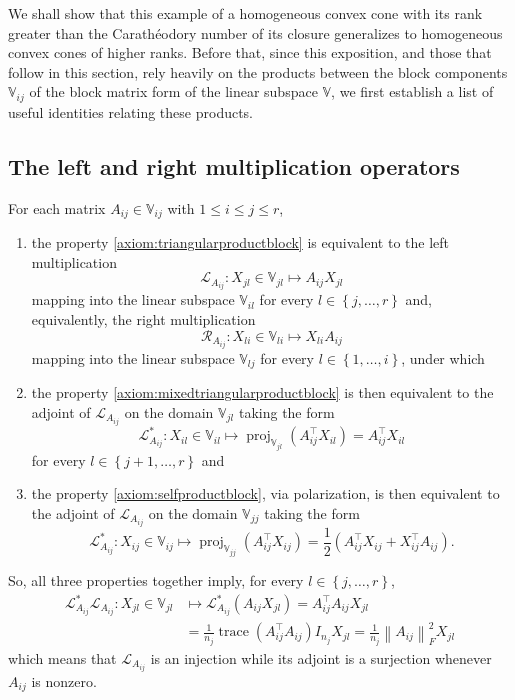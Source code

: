 \documentclass[oneside]{amsart}
\theoremstyle{plain}
\theoremstyle{definition}
\theoremstyle{remark}
\numberwithin{equation}{section}
\DeclareMathOperator{\trace}{trace}
\DeclareMathOperator{\proj}{proj}
\begin{document}
We shall show that this example of a homogeneous convex cone with its rank
greater than the Carath\'eodory number of its closure generalizes to
homogeneous convex cones of higher ranks. Before that, since this
exposition, and those that follow in this section, rely heavily on the
products between the block components $\mathbb{V}_{ij}$ of the block matrix
form of the linear subspace $\mathbb{V}$, we first establish a list of
useful identities relating these products.

\subsection{The left and right multiplication operators}
\label{section:leftrightmultiplications}

For each matrix $A_{ij} \in \mathbb{V}_{ij}$ with $1 \leq i \leq j \leq r$,
\begin{enumerate}[label=(\roman*)]
\item the property \ref{axiom:triangularproductblock} is equivalent to the
left multiplication
\[
\mathcal{L}_{A_{ij}} : X_{jl} \in \mathbb{V}_{jl} \mapsto A_{ij} X_{jl}
\]
mapping into the linear subspace $\mathbb{V}_{il}$ for every $l \in
\left\{j, \dotsc, r\right\}$ and, equivalently, the right multiplication
\[
\mathcal{R}_{A_{ij}} : X_{li} \in \mathbb{V}_{li} \mapsto X_{li} A_{ij}
\]
mapping into the linear subspace $\mathbb{V}_{lj}$ for every $l \in
\left\{1, \dotsc, i\right\}$, under which

\item the property \ref{axiom:mixedtriangularproductblock} is then
equivalent to the adjoint of $\mathcal{L}_{A_{ij}}$ on the domain
$\mathbb{V}_{jl}$ taking the form
\[
\mathcal{L}^{*}_{A_{ij}} : X_{il} \in \mathbb{V}_{il} \mapsto
\proj_{\mathbb{V}_{jl}}\left( A_{ij}^{\top} X_{il} \right) = A_{ij}^{\top}
X_{il}
\]
for every $l \in \left\{j+1, \dotsc, r\right\}$ and

\item the property \ref{axiom:selfproductblock}, via polarization, is then
equivalent to the adjoint of $\mathcal{L}_{A_{ij}}$ on the domain
$\mathbb{V}_{jj}$ taking the form
\[
\mathcal{L}^{*}_{A_{ij}} : X_{ij} \in \mathbb{V}_{ij} \mapsto
\proj_{\mathbb{V}_{jj}}\left( A_{ij}^{\top} X_{ij} \right) = \frac{1}{2}
\left( A_{ij}^{\top} X_{ij} + X_{ij}^{\top} A_{ij} \right).
\]

\end{enumerate}
So, all three properties together imply, for every $l \in \left\{j, \dotsc,
r\right\}$,
\[
\begin{split}
\mathcal{L}^{*}_{A_{ij}} \mathcal{L}_{A_{ij}} : X_{jl} \in \mathbb{V}_{jl}
%
&\mapsto \mathcal{L}^{*}_{A_{ij}} (A_{ij} X_{jl}) = A_{ij}^{\top} A_{ij}
X_{jl}
\\
&= \frac{1}{n_{j}} \trace\left( A_{ij}^{\top} A_{ij} \right) I_{n_{j}}
X_{jl}
%
= \frac{1}{n_{j}} \left\lVert A_{ij}\right\rVert_{F}^{2} X_{jl}
\end{split}
\]
which means that $\mathcal{L}_{A_{ij}}$ is an injection while its adjoint
is a surjection whenever $A_{ij}$ is nonzero.
\end{document}
